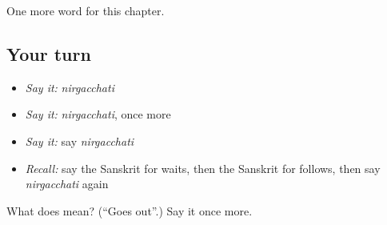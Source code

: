 \begin{grammarlens}[title={What you've built}]
One more word for this chapter.
\end{grammarlens}

\subsection*{Your turn}
\begin{itemize}
\raggedright
  \item \emph{Say it:} \emph{nirgacchati}
  \item \emph{Say it:} \emph{nirgacchati}, once more
  \item \emph{Say it:} say \emph{nirgacchati}
  \item \emph{Recall:} say the Sanskrit for waits, then the Sanskrit for follows, then say \emph{nirgacchati} again
\end{itemize}

\begin{tcolorbox}[breakable,colback=teal!4,colframe=teal!35!black,title={Before you move on}]
What does  mean? (\textquotedblleft{}Goes out\textquotedblright{}.) Say it once more.
\end{tcolorbox}

